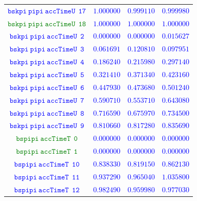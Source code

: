 \documentclass[10pt,a4paper]{article}
\begin{document}
\begin{table}[h!]
{\begin{tabular}{cccc}
\textcolor{blue}{$\mathtt{bskpi~pipi~accTimeU~~17}$} & \textcolor{blue}{$1.000000$}& \textcolor{blue}{$0.999110$}& \textcolor{blue}{$0.999980$}\\
\textcolor{Green}{$\mathtt{bskpi~pipi~accTimeU~~18}$} & \textcolor{blue}{$1.000000$}& \textcolor{blue}{$1.000000$}& \textcolor{blue}{$1.000000$}\\
\textcolor{blue}{$\mathtt{bskpi~pipi~accTimeU~~2}$} & \textcolor{blue}{$0.000000$}& \textcolor{blue}{$0.000000$}& \textcolor{blue}{$0.015627$}\\
\textcolor{blue}{$\mathtt{bskpi~pipi~accTimeU~~3}$} & \textcolor{blue}{$0.061691$}& \textcolor{blue}{$0.120810$}& \textcolor{blue}{$0.097951$}\\
\textcolor{blue}{$\mathtt{bskpi~pipi~accTimeU~~4}$} & \textcolor{blue}{$0.186240$}& \textcolor{blue}{$0.215980$}& \textcolor{blue}{$0.297140$}\\
\textcolor{blue}{$\mathtt{bskpi~pipi~accTimeU~~5}$} & \textcolor{blue}{$0.321410$}& \textcolor{blue}{$0.371340$}& \textcolor{blue}{$0.423160$}\\
\textcolor{blue}{$\mathtt{bskpi~pipi~accTimeU~~6}$} & \textcolor{blue}{$0.447930$}& \textcolor{blue}{$0.473680$}& \textcolor{blue}{$0.501240$}\\
\textcolor{blue}{$\mathtt{bskpi~pipi~accTimeU~~7}$} & \textcolor{blue}{$0.590710$}& \textcolor{blue}{$0.553710$}& \textcolor{blue}{$0.643080$}\\
\textcolor{blue}{$\mathtt{bskpi~pipi~accTimeU~~8}$} & \textcolor{blue}{$0.716590$}& \textcolor{blue}{$0.675970$}& \textcolor{blue}{$0.734500$}\\
\textcolor{blue}{$\mathtt{bskpi~pipi~accTimeU~~9}$} & \textcolor{blue}{$0.810660$}& \textcolor{blue}{$0.817280$}& \textcolor{blue}{$0.835690$}\\
\textcolor{Green}{$\mathtt{bspipi~accTimeT~~0}$} & \textcolor{blue}{$0.000000$}& \textcolor{blue}{$0.000000$}& \textcolor{blue}{$0.000000$}\\
\textcolor{Green}{$\mathtt{bspipi~accTimeT~~1}$} & \textcolor{blue}{$0.000000$}& \textcolor{blue}{$0.000000$}& \textcolor{blue}{$0.000000$}\\
\textcolor{blue}{$\mathtt{bspipi~accTimeT~~10}$} & \textcolor{blue}{$0.838330$}& \textcolor{blue}{$0.819150$}& \textcolor{blue}{$0.862130$}\\
\textcolor{blue}{$\mathtt{bspipi~accTimeT~~11}$} & \textcolor{blue}{$0.937290$}& \textcolor{blue}{$0.965040$}& \textcolor{blue}{$1.035800$}\\
\textcolor{blue}{$\mathtt{bspipi~accTimeT~~12}$} & \textcolor{blue}{$0.982490$}& \textcolor{blue}{$0.959980$}& \textcolor{blue}{$0.977030$}\\

\end{tabular}}
\end{table}
\end{document}
